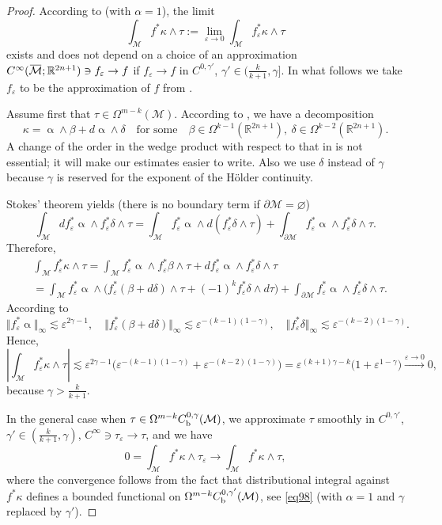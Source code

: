\documentclass[intlimits,12pt,reqno]{amsart}
\newcommand{\cM}{\mathcal M}
\newcommand{\R}{\mathbb R}
\newcommand{\overbar}[1]{\mkern 1.7mu\overline{\mkern-1.7mu#1\mkern-1.5mu}\mkern 1.5mu}
\newcommand{\eps}{\varepsilon}
\numberwithin{equation}{section}
\theoremstyle{definition}
\begin{document}
\begin{proof}
According to  (with $\alpha=1$), the limit
\begin{equation}
\label{eq121}
\int_{\cM} f^*\kappa\wedge\tau := \lim_{\eps\to 0} \int_{\cM} f^*_\eps\kappa\wedge\tau
\end{equation}
exists and does not depend on a choice of an approximation
$C^\infty(\overbar{\cM};\R^{2n+1})\ni f_\eps\to f$ if $f_\eps\to f$ in $C^{0,\gamma'}$, $\gamma'\in (\frac{k}{k+1},\gamma]$. In what follows we take $f_\eps$ to be the approximation of $f$ from .

Assume first that $\tau\in \Omega^{m-k}(\cM)$. According to , we have a decomposition 
$$
\kappa=\upalpha\wedge\beta+d\upalpha\wedge\delta
\quad
\text{for some}
\quad
\beta\in \Omega^{k-1}\left(\R^{2n+1}\right),\ 
\delta\in \Omega^{k-2}\left(\R^{2n+1}\right).
$$
A change of the order in the wedge product with respect to that in  is not essential; it will make our estimates easier to write. Also we use $\delta$ instead of $\gamma$ because $\gamma$ is reserved for the exponent of the H\"older continuity. 

Stokes' theorem yields (there is no boundary term if $\partial\cM=\varnothing$)
$$
\int_{\cM} df_\eps^*\upalpha\wedge f_\eps^*\delta\wedge\tau=
\int_{\cM} f_\eps^*\upalpha\wedge d(f_\eps^*\delta\wedge\tau)+
\int_{\partial\cM} f_\eps^*\upalpha\wedge f_\eps^*\delta\wedge\tau.
$$
Therefore,
\[
\begin{split}
&\int_{\cM} f_\eps^*\kappa\wedge\tau
=
\int_{\cM} f_\eps^*\upalpha\wedge f_\eps^*\beta\wedge\tau +
df_\eps^*\upalpha\wedge f_\eps^*\delta\wedge\tau\\
&=
\int_{\cM} f_\eps^*\upalpha\wedge \big(f_\eps^*(\beta+d\delta)\wedge\tau+(-1)^kf_\eps^*\delta\wedge d\tau\big)
+
\int_{\partial\cM}f_\eps^*\upalpha\wedge f_\eps^*\delta\wedge\tau.
\end{split}
\]
According to 
$$
\Vert f_\eps^*\upalpha\Vert_\infty\lesssim\eps^{2\gamma-1},
\quad
\Vert f_\eps^*(\beta+d\delta)\Vert_\infty\lesssim\eps^{-(k-1)(1-\gamma)},
\quad
\Vert f_\eps^*\delta\Vert_\infty\lesssim\eps^{-(k-2)(1-\gamma)}.
$$
Hence,
$$
\left|\int_{\cM} f^*_\eps\kappa\wedge\tau\right|\lesssim
\eps^{2\gamma-1}\big(\eps^{-(k-1)(1-\gamma)}+\eps^{-(k-2)(1-\gamma)}\big)=
\eps^{(k+1)\gamma-k}\big(1+\eps^{1-\gamma}\big)\stackrel{\eps\to 0}{\longrightarrow} 0,
$$
because $\gamma>\frac{k}{k+1}$.


In the general case when $\tau\in \Omega^{m-k}C_{\rm b}^{0,\gamma}(\cM)$, we approximate $\tau$ smoothly in $C^{0,\gamma'}$, $\gamma'\in(\frac{k}{k+1},\gamma)$, $C^\infty\ni\tau_\eps\to\tau$, and  we have
$$
0=\int_{\cM} f^*\kappa\wedge\tau_\eps\to \int_{\cM}f^*\kappa\wedge\tau,
$$
where the convergence follows from the fact that distributional integral against $f^*\kappa$ defines a bounded functional on $\Omega^{m-k}C_{\rm b}^{0,\gamma'}(\cM)$, see
\eqref{eq98} (with $\alpha=1$ and $\gamma$ replaced by $\gamma'$).
\end{proof}
\end{document}

